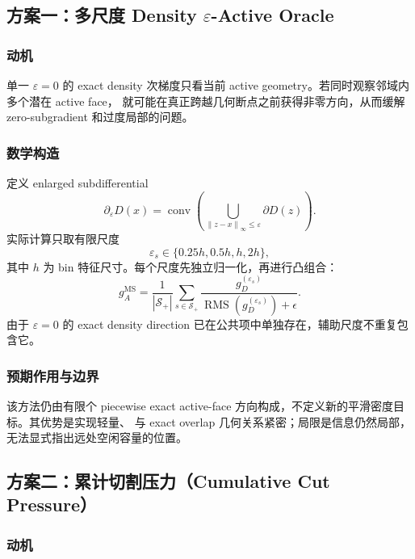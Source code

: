 \documentclass[UTF8,a4paper,11pt]{ctexart}
\newcommand{\norm}[1]{\left\lVert #1\right\rVert}
\newcommand{\rms}{\operatorname{RMS}}
\begin{document}
\subsection{方案一：多尺度 Density \texorpdfstring{$\varepsilon$}{epsilon}-Active Oracle}

\subsubsection{动机}

单一 $\varepsilon=0$ 的 exact density 次梯度只看当前 active geometry。若同时观察邻域内多个潜在 active face，
就可能在真正跨越几何断点之前获得非零方向，从而缓解 zero-subgradient 和过度局部的问题。

\subsubsection{数学构造}

定义 enlarged subdifferential
\begin{equation}
  \partial_{\varepsilon}D(x)=
  \operatorname{conv}
  \left(
  \bigcup_{\norm{z-x}_{\infty}\le\varepsilon}\partial D(z)
  \right).
  \label{eq:epsilon-subdiff}
\end{equation}
实际计算只取有限尺度
\[
  \varepsilon_s\in\{0.25h,0.5h,h,2h\},
\]
其中 $h$ 为 bin 特征尺寸。每个尺度先独立归一化，再进行凸组合：
\begin{equation}
  g_A^{\mathrm{MS}}=
  \frac{1}{|\mathcal S_+|}
  \sum_{s\in\mathcal S_+}
  \frac{g_D^{(\varepsilon_s)}}
  {\rms(g_D^{(\varepsilon_s)})+\epsilon}.
  \label{eq:multiscale}
\end{equation}
由于 $\varepsilon=0$ 的 exact density direction 已在公共项中单独存在，辅助尺度不重复包含它。

\subsubsection{预期作用与边界}

该方法仍由有限个 piecewise exact active-face 方向构成，不定义新的平滑密度目标。其优势是实现轻量、
与 exact overlap 几何关系紧密；局限是信息仍然局部，无法显式指出远处空闲容量的位置。

\subsection{方案二：累计切割压力（Cumulative Cut Pressure）}

\subsubsection{动机}
\end{document}
